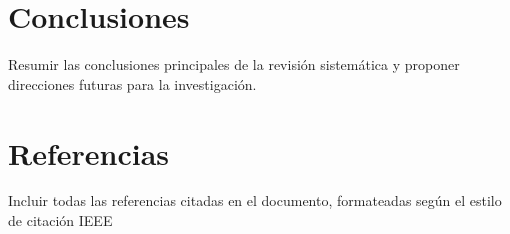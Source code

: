 \documentclass{article}
\begin{document}
\section{Conclusiones}
\noindent Resumir las conclusiones principales de la revisión sistemática y proponer direcciones futuras para la investigación.

\section{Referencias}
\noindent Incluir todas las referencias citadas en el documento, formateadas según el estilo de citación IEEE



\end{document}
